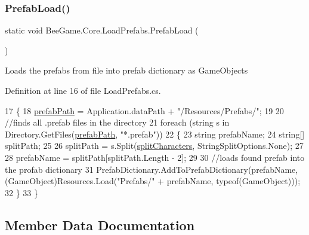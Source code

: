 \subsubsection{\texorpdfstring{Prefab\+Load()}{PrefabLoad()}}
{\footnotesize\ttfamily static void Bee\+Game.\+Core.\+Load\+Prefabs.\+Prefab\+Load (\begin{DoxyParamCaption}{ }\end{DoxyParamCaption})\hspace{0.3cm}{\ttfamily [static]}}



Loads the prefabs from file into prefab dictionary as Game\+Objects 



Definition at line 16 of file Load\+Prefabs.\+cs.


\begin{DoxyCode}
17         \{
18             \hyperlink{class_bee_game_1_1_core_1_1_load_prefabs_a0f61e1d478ea8953fc4cfa5fa4a59b90}{prefabPath} = Application.dataPath + \textcolor{stringliteral}{"/Resources/Prefabs/"};
19 
20             \textcolor{comment}{//finds all .prefab files in the directory}
21             \textcolor{keywordflow}{foreach} (\textcolor{keywordtype}{string} s \textcolor{keywordflow}{in} Directory.GetFiles(\hyperlink{class_bee_game_1_1_core_1_1_load_prefabs_a0f61e1d478ea8953fc4cfa5fa4a59b90}{prefabPath}, \textcolor{stringliteral}{"*.prefab"}))
22             \{
23                 \textcolor{keywordtype}{string} prefabName;
24                 \textcolor{keywordtype}{string}[] splitPath;
25 
26                 splitPath = s.Split(\hyperlink{class_bee_game_1_1_core_1_1_load_prefabs_a774463c4978def7fe0052c4ed1b46549}{splitCharacters}, StringSplitOptions.None);
27 
28                 prefabName = splitPath[splitPath.Length - 2];
29 
30                 \textcolor{comment}{//loads found prefab into the profab dictionary}
31                 PrefabDictionary.AddToPrefabDictionary(prefabName, (GameObject)Resources.Load(\textcolor{stringliteral}{"Prefabs/"} + 
      prefabName, typeof(GameObject)));
32             \}
33         \}
\end{DoxyCode}


\subsection{Member Data Documentation}
\mbox{\label{class_bee_game_1_1_core_1_1_load_prefabs_ac87d57b130a1b2542a3327a56b429f68}} 
